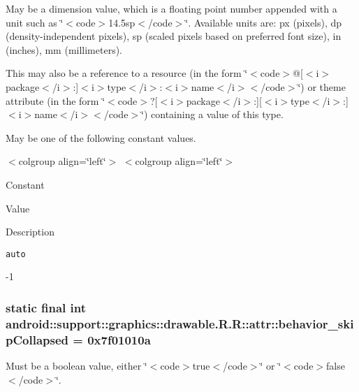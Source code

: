 May be a dimension value, which is a floating point number appended with a unit such as \char`\"{}$<$code$>$14.5sp$<$/code$>$\char`\"{}. Available units are: px (pixels), dp (density-independent pixels), sp (scaled pixels based on preferred font size), in (inches), mm (millimeters). 

This may also be a reference to a resource (in the form \char`\"{}$<$code$>$@\mbox{[}$<$i$>$package$<$/i$>$:\mbox{]}$<$i$>$type$<$/i$>$:$<$i$>$name$<$/i$>$$<$/code$>$\char`\"{}) or theme attribute (in the form \char`\"{}$<$code$>$?\mbox{[}$<$i$>$package$<$/i$>$:\mbox{]}\mbox{[}$<$i$>$type$<$/i$>$:\mbox{]}$<$i$>$name$<$/i$>$$<$/code$>$\char`\"{}) containing a value of this type. 

May be one of the following constant values. \begin{TabularC}{0}
\hline
\end{TabularC}
$<$colgroup align=\char`\"{}left\char`\"{}$>$ $<$colgroup align=\char`\"{}left\char`\"{}$>$ 

Constant

Value

Description 

{\tt auto}

-1\hypertarget{classandroid_1_1support_1_1graphics_1_1drawable_1_1_r_1_1attr_482863cc47c02c39246b2280b9616f77}{
\subsubsection[{behavior\_\-skipCollapsed}]{\setlength{\rightskip}{0pt plus 5cm}static final int android::support::graphics::drawable.R.R::attr::behavior\_\-skipCollapsed = 0x7f01010a}}
\label{classandroid_1_1support_1_1graphics_1_1drawable_1_1_r_1_1attr_482863cc47c02c39246b2280b9616f77}


Must be a boolean value, either \char`\"{}$<$code$>$true$<$/code$>$\char`\"{} or \char`\"{}$<$code$>$false$<$/code$>$\char`\"{}. 

